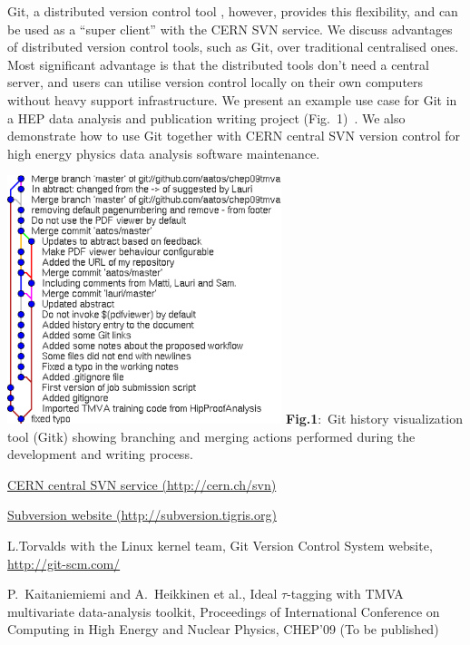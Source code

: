 \documentclass[12pt]{article}
\begin{document}
\begin{minipage}{6cm}
Git, a distributed version control tool \cite{torvalds}, however, 
provides this flexibility, 
and can be used as a ``super client'' with the CERN SVN service.
We discuss advantages of distributed version control tools,
such as Git, over traditional centralised ones. 
Most significant advantage is that the distributed
tools don't need a central server, and users can utilise
version control locally on their own computers without
heavy support infrastructure.
We present an example use case for Git in a HEP data analysis and publication writing project (Fig.~1)~\cite{pk09aProceedings}.
We also demonstrate how to use Git
together with CERN central SVN version control for high energy physics data
analysis software maintenance.

\end{minipage}
 \hfill
 \begin{minipage}{8cm}
\includegraphics[width=8cm]{gitk.eps} 
{\bf Fig.1}:~Git history visualization tool (Gitk) showing branching and merging actions
performed during the development and writing process.
\end{minipage}


\begin{thebibliography}{9}
\href{http://cern.ch/svn}{CERN central SVN service (http://cern.ch/svn)}

\href{http://subversion.tigris.org}{Subversion website (http://subversion.tigris.org)}

L.Torvalds with the Linux kernel team,
Git Version Control System website,
\href{http://git-scm.com/}{http://git-scm.com/}


P.~Kaitaniemiemi and A.~Heikkinen et al.,
Ideal $\tau$-tagging with TMVA multivariate data-analysis toolkit,
Proceedings of International Conference on 
Computing in High Energy and Nuclear Physics, CHEP'09
(To be published)

\end{thebibliography}
\end{document}
